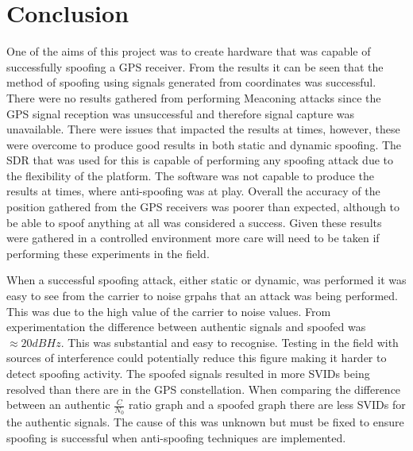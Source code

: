 
\chapter{Conclusion} %

\label{Chapter6} %


One of the aims of this project was to create hardware that was capable of successfully spoofing a GPS receiver. From the results it can be seen that the method of
spoofing using signals generated from coordinates was successful. There were no results gathered from performing Meaconing attacks since the GPS signal reception was
unsuccessful and therefore signal capture was unavailable. There were issues that impacted the results at times, however, these were overcome to produce good results in
both static and dynamic spoofing. The SDR that was used for this is capable of performing any spoofing attack due to the flexibility of the platform. The software was not
capable to produce the results at times, where anti-spoofing was at play. Overall the accuracy of the position gathered from the GPS receivers was poorer than expected,
although to be able to spoof anything at all was considered a success. Given these results were gathered in a controlled environment more care will need to be taken if
performing these experiments in the field. 

\bigskip

When a successful spoofing attack, either static or dynamic, was performed it was easy to see from the carrier to noise grpahs that an attack was being performed. This
was due to the high value of the carrier to noise values. From experimentation the difference between authentic signals and spoofed was $\approx 20dBHz$. This was
substantial and easy to recognise. Testing in the field with sources of interference could potentially reduce this figure making it harder to detect spoofing activity.
The spoofed signals resulted in more SVIDs being resolved than there are in the GPS constellation. When comparing the difference between an authentic $\frac{C}{N_0}$
ratio graph and a spoofed graph there are less SVIDs for the authentic signals. The cause of this was unknown but must be fixed to ensure spoofing is successful when
anti-spoofing techniques are implemented.  

